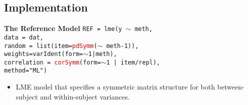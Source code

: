 \documentclass[compress]{beamer}        %
\makeatletter
\newcommand{\tcb}{\textcolor{beamer@blendedblue}}
\newcommand{\tcr}{\textcolor{red}}
\makeatother
\begin{document}
\subsection{Implementation}

\begin{frame}[fragile]{\bf \tcb{The Reference Model}}
\texttt{REF = lme(y $\sim$ meth,\\
   \hspace{0.6cm} data = dat,\\
   \hspace{0.6cm} random = list(item=\tcr{pdSymm}($\sim$ meth-1)), \\
   \hspace{0.6cm} weights=varIdent(form=$\sim$1|meth),\\
   \hspace{0.6cm} correlation = \tcr{corSymm}(form=$\sim$1 | item/repl),\\
   \hspace{0.6cm} method="ML")}\\
\begin{itemize}
\item LME model that specifies a symmetric matrix structure for both between-subject and within-subject variances.
\end{itemize}

\end{frame}
\end{document}
